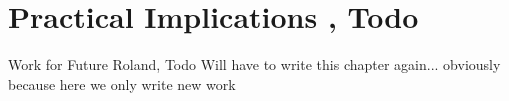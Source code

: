 \section{Practical Implications , Todo}
Work for Future Roland, Todo
Will have to write this chapter again... obviously because here we only write new work
